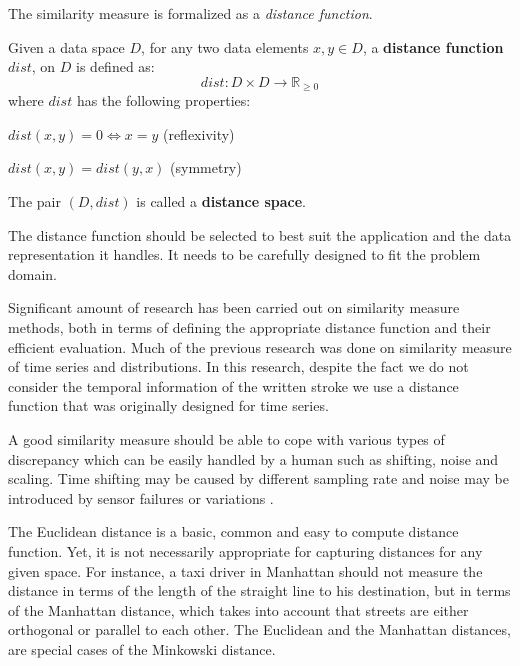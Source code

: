 \iftoggle{edit-mode}{\hspace{0pt}\marginpar{Distance function formal definition}}{}
The similarity measure is formalized as a \emph{distance function}. 
\begin{definition}
Given a data space $D$, for any two data elements $x,y \in D$, a \textbf{distance function} $dist$, on $D$ is defined as:
\begin{equation}
dist: D \times D \longrightarrow \mathbb R_{\geq 0} 
\end{equation}
where $dist$ has the following properties:
\begin{compactitem}
\item $dist(x,y)=0 \Leftrightarrow x=y$ (reflexivity)
\item $dist(x,y) = dist(y,x)$ (symmetry)
\end{compactitem}
The pair $(D,dist)$ is called a \textbf{distance space}.
\label{def:distance_function}
\end{definition}

\iftoggle{edit-mode}{\hspace{0pt}\marginpar{Distance function selection}}{}
The distance function should be selected to best suit the application and the data representation it handles. It needs to be carefully designed to fit the problem domain.

\iftoggle{edit-mode}{\hspace{0pt}\marginpar{Previous research}}{}
Significant amount of research has been carried out on similarity measure methods, both in terms of defining the appropriate distance function and their efficient evaluation. Much of the previous research was done on similarity measure of time series and distributions. In this research, despite the fact we do not consider the temporal information of the written stroke we use a distance function that was originally designed for time series.

\iftoggle{edit-mode}{\hspace{0pt}\marginpar{Properties of a good dissimilarity measure.}}{}
A good similarity measure should be able to cope with various types of discrepancy which can be easily handled by a human such as shifting, noise and scaling. Time shifting may be caused by different sampling rate and noise may be introduced by sensor failures or variations \cite{chen2005similarity}.

\iftoggle{edit-mode}{\hspace{0pt}\marginpar{Euclidean and Manhattan}}{}
The Euclidean distance is a basic, common and easy to compute distance function. Yet, it is not necessarily appropriate for capturing distances for any given space. For instance, a taxi driver in Manhattan should not measure the distance in terms of the length of the straight line to his destination, but in terms of the Manhattan distance, which takes into account that streets are either orthogonal or parallel to each other.
The Euclidean and the Manhattan distances, are special cases of the Minkowski distance.

